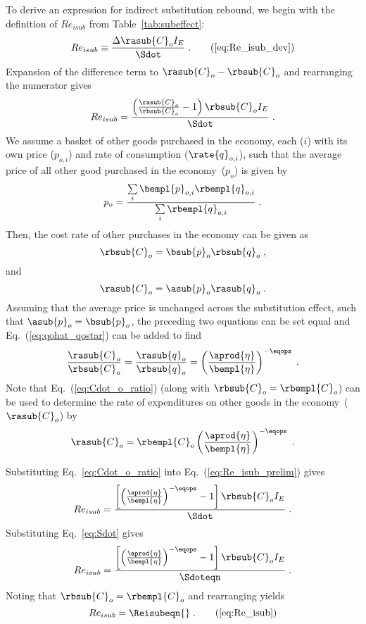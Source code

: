 To derive an expression for indirect substitution rebound,
we begin with the definition of $Re_{isub}$
from Table~\ref{tab:subeffect}:
%
\begin{equation}
  Re_{isub} \equiv \frac{\Delta \rasub{C}_o I_E}{\Sdot} \; .  \tag{\ref{eq:Re_isub_dev}}
\end{equation}
%
Expansion of the difference term to $\rasub{C}_o - \rbsub{C}_o$ and rearranging the numerator gives
%
\begin{equation} \label{eq:Re_isub_prelim}
  Re_{isub} = \frac{\left( \frac{\rasub{C}_o}{\rbsub{C}_o} - 1  \right) \rbsub{C}_o I_E} {\Sdot} \; .
\end{equation}
%
We assume a basket of other goods purchased in the economy,
each ($i$) with its own price ($p_{o,i}$) and rate of consumption ($\rate{q}_{o,i}$),
such that the average price of all other good purchased in the economy~($p_o$) is given by
%
\begin{equation}
  p_o = \frac{\sum\limits_i \bempl{p}_{o,i} \rbempl{q}_{o,i}}{\sum\limits_i \rbempl{q}_{o,i}} \; .
\end{equation}
%
Then, the cost rate of other purchases in the economy can be given as
%
\begin{equation}
  \rbsub{C}_o = \bsub{p}_o \rbsub{q}_o \; ,
\end{equation}
%
and
%
\begin{equation}
  \rasub{C}_o = \asub{p}_o \rasub{q}_o \; .
\end{equation}
%
Assuming that the average price is unchanged across the substitution effect,
such that $\asub{p}_o = \bsub{p}_o$,
the preceding two equations can be set equal and Eq.~(\ref{eq:qohat_qostar}) can be added to find
%
\begin{equation} \label{eq:Cdot_o_ratio}
  \frac{\rasub{C}_o}{\rbsub{C}_o} 
      = \frac{\rasub{q}_o}{\rbsub{q}_o} 
      = \left( \frac{\aprod{\eta}}{\bempl{\eta}} \right)^{-\eqops}  \; .
\end{equation}
%
Note that Eq.~(\ref{eq:Cdot_o_ratio}) 
(along with $\rbsub{C}_o = \rbempl{C}_o$)
can be used to determine the rate of expenditures 
on other goods in the economy~($\rasub{C}_o$) by
%
\begin{equation}
  \rasub{C}_o = \rbempl{C}_o \left( \frac{\aprod{\eta}}{\bempl{\eta}} \right)^{-\eqops} \; .
\end{equation}

Substituting Eq.~\ref{eq:Cdot_o_ratio} into Eq.~(\ref{eq:Re_isub_prelim}) gives
%
\begin{equation}
  Re_{isub} = \frac{\left[ \left( \frac{\aprod{\eta}}{\bempl{\eta}} \right)^{-\eqops} - 1  \right] \rbsub{C}_o I_E} {\Sdot} \; .
\end{equation}
Substituting Eq.~\ref{eq:Sdot} gives
%
\begin{equation}
  Re_{isub} = \frac{\left[ \left(\frac{\aprod{\eta}}{\bempl{\eta}} \right)
                  ^{-\eqops} - 1  \right] \rbsub{C}_o I_E}
                  {\Sdoteqn} \; .
\end{equation}
%
Noting that $\rbsub{C}_o = \rbempl{C}_o$ and rearranging yields
%
\begin{equation}
  Re_{isub} = \Reisubeqn{} \; . \tag{\ref{eq:Re_isub}}
\end{equation}

